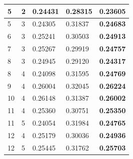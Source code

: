 \documentclass[12pt]{report}
\begin{document}
\begin{table}[htpb]
\begin{tabular}{lllll}
\multicolumn{1}{|l|}{5}       & \multicolumn{1}{l|}{2}                        & \multicolumn{1}{l|}{0.24431}         & \multicolumn{1}{l|}{0.28315}            & \multicolumn{1}{l|}{{\bf 0.23605}}      \\ \hline
\multicolumn{1}{|l|}{5}       & \multicolumn{1}{l|}{3}                        & \multicolumn{1}{l|}{0.24305}         & \multicolumn{1}{l|}{0.31837}            & \multicolumn{1}{l|}{{\bf 0.24683}}      \\ \hline
\multicolumn{1}{|l|}{6}       & \multicolumn{1}{l|}{3}                        & \multicolumn{1}{l|}{0.25241}         & \multicolumn{1}{l|}{0.30503}            & \multicolumn{1}{l|}{{\bf 0.24913}}      \\ \hline
\multicolumn{1}{|l|}{7}       & \multicolumn{1}{l|}{3}                        & \multicolumn{1}{l|}{0.25267}         & \multicolumn{1}{l|}{0.29919}            & \multicolumn{1}{l|}{{\bf 0.24757}}      \\ \hline
\multicolumn{1}{|l|}{8}       & \multicolumn{1}{l|}{3}                        & \multicolumn{1}{l|}{0.24945}         & \multicolumn{1}{l|}{0.29120}            & \multicolumn{1}{l|}{{\bf 0.24317}}      \\ \hline
\multicolumn{1}{|l|}{8}       & \multicolumn{1}{l|}{4}                        & \multicolumn{1}{l|}{0.24098}         & \multicolumn{1}{l|}{0.31595}            & \multicolumn{1}{l|}{{\bf 0.24769}}      \\ \hline
\multicolumn{1}{|l|}{9}       & \multicolumn{1}{l|}{4}                        & \multicolumn{1}{l|}{0.26004}         & \multicolumn{1}{l|}{0.32045}            & \multicolumn{1}{l|}{{\bf 0.26224}}      \\ \hline
\multicolumn{1}{|l|}{10}      & \multicolumn{1}{l|}{4}                        & \multicolumn{1}{l|}{0.26148}         & \multicolumn{1}{l|}{0.31387}            & \multicolumn{1}{l|}{{\bf 0.26002}}      \\ \hline
\multicolumn{1}{|l|}{11}      & \multicolumn{1}{l|}{4}                        & \multicolumn{1}{l|}{0.25360}         & \multicolumn{1}{l|}{0.30751}            & \multicolumn{1}{l|}{{\bf 0.25350}}      \\ \hline
\multicolumn{1}{|l|}{11}      & \multicolumn{1}{l|}{5}                        & \multicolumn{1}{l|}{0.24054}         & \multicolumn{1}{l|}{0.31984}            & \multicolumn{1}{l|}{{\bf 0.24765}}      \\ \hline
\multicolumn{1}{|l|}{12}      & \multicolumn{1}{l|}{4}                        & \multicolumn{1}{l|}{0.25179}         & \multicolumn{1}{l|}{0.30036}            & \multicolumn{1}{l|}{{\bf 0.24936}}      \\ \hline
\multicolumn{1}{|l|}{12}      & \multicolumn{1}{l|}{5}                        & \multicolumn{1}{l|}{0.25445}         & \multicolumn{1}{l|}{0.31762}            & \multicolumn{1}{l|}{{\bf 0.25703}}      \\ \hline
\end{tabular}
\end{table}
\end{document}
